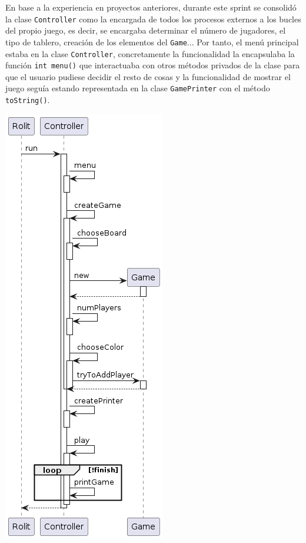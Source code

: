 \documentclass[../DocumentoOficial.tex]{subfiles}
\begin{document}
\begin{sprint}[2]
En base a la experiencia en proyectos anteriores, durante este sprint se consolidó la clase \texttt{Controller} como la encargada de todos los procesos externos a los bucles del propio juego, es decir, se encargaba determinar el número de jugadores, el tipo de tablero, creación de los elementos del \texttt{Game}... Por tanto, el menú principal estaba en la clase \texttt{Controller}, concretamente la funcionalidad la encapsulaba la función \texttt{int menu()} que interactuaba con otros métodos privados de la clase para que el usuario pudiese decidir el resto de cosas y la funcionalidad de mostrar el juego seguía estando representada en la clase \texttt{GamePrinter} con el método \texttt{toString()}.

\begin{center}
\includegraphics[scale=0.55]{MenuPpal_sprint2_seq}
\end{center}
\end{sprint}
\end{document}
